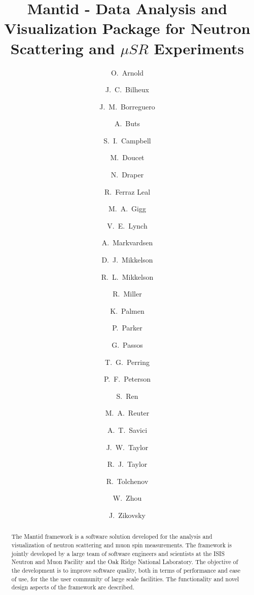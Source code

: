 \documentclass[1p]{elsarticle}
\begin{document}
\begin{frontmatter}



\title{Mantid - Data Analysis and Visualization Package for Neutron Scattering and $\mu SR$ Experiments}

\author[tessellaUK]{O.~Arnold}
\author[ornl]{J.~C.~Bilheux}
\author[ornl]{J.~M.~Borreguero}
\author[isis]{A.~Buts}
\author[ornl]{S.~I.~Campbell}
\author[ornl]{M.~Doucet}
\author[tessellaUK]{N.~Draper}
\author[ill]{R.~Ferraz Leal}
\author[tessellaUK]{M.~A.~Gigg}
\author[ornl]{V.~E.~Lynch}
\author[isis]{A.~Markvardsen}
\author[uws,ornl]{D.~J.~Mikkelson}
\author[uws,ornl]{R.~L.~Mikkelson}
\author[nccsornl]{R.~Miller}
\author[isis]{K.~Palmen}
\author[isis]{P.~Parker}
\author[isis]{G.~Passos}
\author[isis]{T.~G.~Perring}
\author[ornl]{P.~F.~Peterson}
\author[ornl]{S.~Ren}
\author[ornl]{M.~A.~Reuter}
\author[ornl]{A.~T.~Savici}
\let\thefootnote\relax{}
\author[isis]{J.~W.~Taylor}
\author[tessellaUS,ornl]{R.~J.~Taylor}
\author[tessellaUK]{R.~Tolchenov}
\author[ornl]{W.~Zhou}
\author[ornl]{J.~Zikovsky}

\address[tessellaUK]{Tessella Ltd., Abingdon, Oxfordshire, UK}
\address[ornl]{Neutron Data Analysis and Visualization, Oak Ridge National Laboratory, Oak~Ridge,~TN,~USA}

\address[isis]{ISIS Facility, Rutherford Appleton Laboratory, Chilton, Didcot, Oxfordshire, UK}
\address[ill]{Institut Laue-Langevin, Grenoble, France}
\address[uws]{University of Wisconsin-Stout, Menomonie, WI, USA}
\address[nccsornl]{Computing and Computational Science Directorate, Oak Ridge National Laboratory, Oak~Ridge,~TN,~USA}
\address[tessellaUS]{Tessella Inc., Newton, MA, USA}


\begin{abstract}
The Mantid framework is a software solution developed for the analysis and visualization of neutron scattering and muon spin measurements. The framework is jointly developed by a large team of software engineers and scientists at the ISIS Neutron and Muon Facility and the Oak Ridge National Laboratory.  The objective of the development is to improve software quality, both in terms of performance and ease of use, for the the user community of large scale facilities. 
The functionality and novel design aspects of the framework are described.
\end{abstract}


\end{frontmatter}
\end{document}
